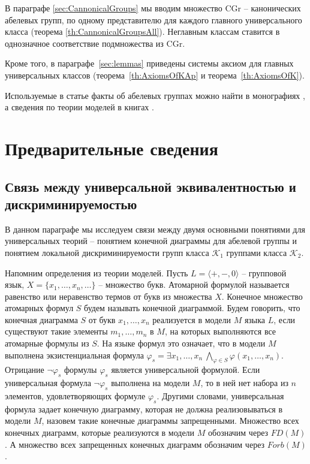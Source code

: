 \documentclass[a4paper,11pt,twoside]{article}
\def\K{{\mathcal{K}}}
\def\CG{{\mathrm{CGr}}}
\begin{document}
В параграфе \ref{sec:CannonicalGroups} мы вводим множество $\CG$ -- канонических абелевых групп, по одному представителю для каждого главного универсального класса (теорема \ref{th:CannonicalGroupsAll}). Неглавным классам ставится в однозначное соответствие подмножества из $\CG$.

Кроме того, в параграфе~\ref{sec:lemmas} приведены системы аксиом для главных универсальных классов (теорема~\ref{th:AxiomsOfKAp} и теорема~\ref{th:AxiomsOfK}).

Используемые в статье факты об абелевых группах можно найти в монографиях \cite{Fuchs1, Fuchs2}, а сведения по теории моделей в книгах \cite{Ershov, Hodges, DM}.


\section{Предварительные сведения}

\subsection{Связь между универсальной эквивалентностью и дискриминируемостью}

В данном параграфе мы исследуем связи между двумя основными понятиями для универсальных теорий -- понятием конечной диаграммы для абелевой группы и понятием локальной дискриминируемости групп класса $\K_1$ группами класса $\K_2$.

Напомним определения из теории моделей. Пусть $L = \langle +, -, 0\rangle$ -- групповой язык, $X = \{x_1, \ldots, x_n, \ldots\}$ -- множество букв. Атомарной формулой называется равенство или неравенство термов от букв из множества $X$. Конечное множество атомарных формул $S$ будем называть конечной диаграммой. Будем говорить, что конечная диаграмма $S$ от букв $x_1, \ldots, x_n$ реализуется в модели $M$ языка $L$, если существуют такие элементы $m_1, \ldots, m_n$ в $M$, на которых выполняются все атомарные формулы из $S$. На языке формул это означает, что в модели $M$ выполнена экзистенциальная формула $\varphi_s = \exists x_1, \ldots, x_n \ \bigwedge\limits_{\varphi \in S} \varphi(x_1, \ldots, x_n)$. Отрицание $\neg\varphi_s$ формулы $\varphi_s$ является универсальной формулой. Если универсальная формула $\neg\varphi_s$ выполнена на модели $M$, то в ней нет набора из $n$ элементов, удовлетворяющих формуле $\varphi_s$. 
Другими словами, универсальная формула задает конечную диаграмму, которая не должна реализовываться в модели $M$, назовем такие конечные диаграммы запрещенными. Множество всех конечных диаграмм, которые реализуются в модели $M$ обозначим через $FD(M)$. А множество всех запрещенных конечных диаграмм обозначим через $Forb(M)$.
\end{document}
